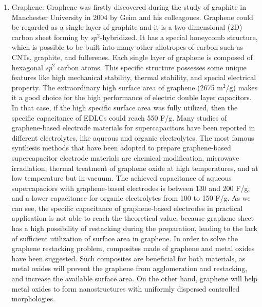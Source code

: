 \documentclass[reprint,amsmath,amssymb,aps,floatfix,
]{revtex4-2}
\begin{document}
\begin{enumerate}
    \item Graphene: Graphene was firstly discovered during the study of graphite in Manchester University in 2004 by Geim and his colleagoues.\cite{Novoselov2004} Graphene could be regarded as a single layer of graphite and it is a two-dimensional (2D) carbon sheet forming by {\it sp}$^2$-hybridized. It has a special honeycomb structure, which is possible to be built into many other allotropes of carbon such as CNTs, graphite, and fullerenes. Each single layer of graphene is composed of hexagonal {\it sp}$^2$ carbon atoms. This specific structure possesses some unique features like high mechanical stability, thermal stability, and special electrical property. The extraordinary high surface area of graphene (2675 m$^2$/g) makes it a good choice for the high performance of electric double layer capacitors. In that case, if the high specific surface area was fully utilized, then the specific capacitance of EDLCs could reach 550 F/g. Many studies of graphene-based electrode materials for supercapacitors have been reported in different electrolytes, like aqueous and organic electrolytes. The most famous synthesis methods that have been adopted to prepare graphene-based supercapacitor electrode materials are chemical modification, microwave irradiation, thermal treatment of graphene oxide at high temperatures, and at low temperature but in vacuum. The achieved capacitance of aqueous supercapaciors with graphene-based electrodes is between 130 and 200 F/g,\cite{Linh2011} and a lower capacitance for organic electrolytes from 100 to 150 F/g. As we can see, the specific capacitance of graphene-based electrodes in practical application is not able to reach the theoretical value, because graphene sheet has a high possibility of restacking during the preparation, leading to the lack of sufficient utilization of surface area in graphene. In order to solve the graphene restacking problem, composites made of graphene and metal oxides have been suggested. Such composites are beneficial for both materials, as metal oxides will prevent the graphene from agglomeration and restacking, and increase the available surface area. On the other hand, graphene will help metal oxides to form nanostructures with uniformly dispersed controlled morphologies.
\end{enumerate}
\end{document}
